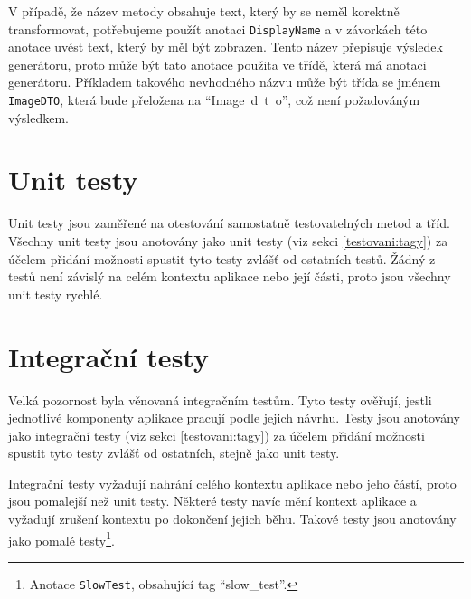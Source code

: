     V případě, že název metody obsahuje text, který by se neměl korektně transformovat, potřebujeme použít anotaci \verb|DisplayName| a v závorkách této anotace uvést text, který by měl být zobrazen. Tento název přepisuje výsledek generátoru, proto může být tato anotace použita ve třídě, která má anotaci generátoru. Příkladem takového nevhodného názvu může být třída se jménem \verb|ImageDTO|, která bude přeložena na \enquote{Image~d~t~o}, což není požadováným výsledkem.
    
\section{Unit testy}\label{testovani:unit}
    Unit testy jsou zaměřené na otestování samostatně testovatelných metod a tříd. Všechny unit testy jsou anotovány jako unit testy (viz sekci \ref{testovani:tagy}) za účelem přidání možnosti spustit tyto testy zvlášť od ostatních testů. Žádný z testů není závislý na celém kontextu aplikace nebo její části, proto jsou všechny unit testy rychlé.
    
\section{Integrační testy}\label{testovani:intergacni}
    Velká pozornost byla věnovaná integračním testům. Tyto testy ověřují, jestli jednotlivé komponenty aplikace pracují podle jejich návrhu. Testy jsou anotovány jako integrační testy (viz sekci \ref{testovani:tagy}) za účelem přidání možnosti spustit tyto testy zvlášť od ostatních, stejně jako unit testy. 
    
    Integrační testy vyžadují nahrání celého kontextu aplikace nebo jeho částí, proto jsou pomalejší než unit testy. Některé testy navíc mění kontext aplikace a vyžadují zrušení kontextu po dokončení jejich běhu. Takové testy jsou anotovány jako pomalé testy\footnote{Anotace \texttt{SlowTest}, obsahující tag \enquote{slow\_test}.}.
    
